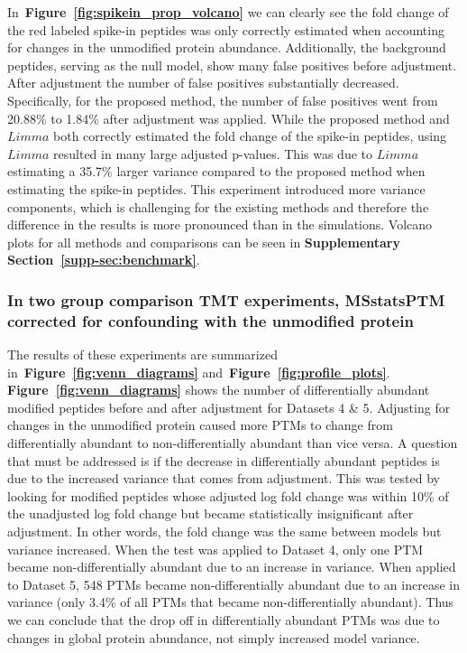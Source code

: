 \documentclass[mcp]{article}
\numberwithin{table}{section}
\def\figref#1{{\bf Figure~\ref{fig:#1}}}
\begin{document}
In~\figref{spikein_prop_volcano} we can clearly see the fold change of the red labeled spike-in peptides was only correctly estimated when accounting for changes in the unmodified protein abundance. Additionally, the background peptides, serving as the null model, show many false positives before adjustment. After adjustment the number of false positives substantially decreased. Specifically, for the proposed method, the number of false positives went from 20.88\% to 1.84\% after adjustment was applied. While the proposed method and $Limma$ both correctly estimated the fold change of the spike-in peptides, using $Limma$ resulted in many large adjusted p-values. This was due to $Limma$ estimating a 35.7\% larger variance compared to the proposed method when estimating the spike-in peptides. This experiment introduced more variance components, which is challenging for the existing methods and therefore the difference in the results is more pronounced than in the simulations. Volcano plots for all methods and comparisons can be seen in {\bf Supplementary Section~\ref{supp-sec:benchmark}}.

\subsubsection*{In two group comparison TMT experiments, MSstatsPTM corrected for confounding with the unmodified protein}

The results of these experiments are summarized in~\figref{venn_diagrams} and~\figref{profile_plots}. \figref{venn_diagrams} shows the number of differentially abundant modified peptides before and after adjustment for Datasets 4 \& 5. Adjusting for changes in the unmodified protein caused more PTMs to change from differentially abundant to non-differentially abundant than vice versa. A question that must be addressed is if the decrease in differentially abundant peptides is due to the increased variance that comes from adjustment. This was tested by looking for modified peptides whose adjusted log fold change was within 10\% of the unadjusted log fold change but became statistically insignificant after adjustment. In other words, the fold change was the same between models but variance increased. When the test was applied to Dataset 4, only one PTM became non-differentially abundant due to an increase in variance. When applied to Dataset 5, 548 PTMs became non-differentially abundant due to an increase in variance (only 3.4\% of all PTMs that became non-differentially abundant). Thus we can conclude that the drop off in differentially abundant PTMs was due to changes in global protein abundance, not simply increased model variance.
\end{document}
